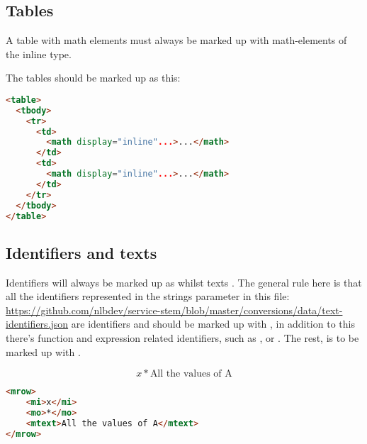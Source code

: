 \documentclass[english,a4paper,11pt]{article}
\begin{document}
\subsection{Tables}

A table with math elements must always be marked up with math-elements of the inline type.

\begin{examples}
The tables should be marked up as this:
\begin{lstlisting}[language=HTML]
<table>
  <tbody>
    <tr>
      <td>
        <math display="inline"...>...</math>
      </td>
      <td>
        <math display="inline"...>...</math>
      </td>
    </tr>
  </tbody>
</table>
\end{lstlisting}
\end{examples}

\subsection{Identifiers and texts}

Identifiers will always be marked up as  whilst texts . The general rule here is that all the identifiers represented in the strings parameter in this file: \url{https://github.com/nlbdev/service-stem/blob/master/conversions/data/text-identifiers.json} are identifiers and should be marked up with , in addition to this there's function and expression related identifiers, such as ,  or . The rest, is to be marked up with .

\begin{examples}
\begin{equation}
	x * \text{All the values of A}
\end{equation}
\begin{lstlisting}[language=HTML]
<mrow>
	<mi>x</mi>
	<mo>*</mo>
	<mtext>All the values of A</mtext>
</mrow>
\end{lstlisting}
\end{examples}
\end{document}
